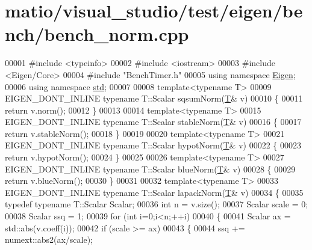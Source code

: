 \hypertarget{matio_2visual__studio_2test_2eigen_2bench_2bench__norm_8cpp_source}{}\section{matio/visual\+\_\+studio/test/eigen/bench/bench\+\_\+norm.cpp}
\label{matio_2visual__studio_2test_2eigen_2bench_2bench__norm_8cpp_source}

\begin{DoxyCode}
00001 \textcolor{preprocessor}{#include <typeinfo>}
00002 \textcolor{preprocessor}{#include <iostream>}
00003 \textcolor{preprocessor}{#include <Eigen/Core>}
00004 \textcolor{preprocessor}{#include "BenchTimer.h"}
00005 \textcolor{keyword}{using namespace }\hyperlink{namespace_eigen}{Eigen};
00006 \textcolor{keyword}{using namespace }\hyperlink{namespacestd}{std};
00007 
00008 \textcolor{keyword}{template}<\textcolor{keyword}{typename} T>
00009 EIGEN\_DONT\_INLINE \textcolor{keyword}{typename} T::Scalar sqsumNorm(\hyperlink{group___sparse_core___module}{T}& v)
00010 \{
00011   \textcolor{keywordflow}{return} v.norm();
00012 \}
00013 
00014 \textcolor{keyword}{template}<\textcolor{keyword}{typename} T>
00015 EIGEN\_DONT\_INLINE \textcolor{keyword}{typename} T::Scalar stableNorm(\hyperlink{group___sparse_core___module}{T}& v)
00016 \{
00017   \textcolor{keywordflow}{return} v.stableNorm();
00018 \}
00019 
00020 \textcolor{keyword}{template}<\textcolor{keyword}{typename} T>
00021 EIGEN\_DONT\_INLINE \textcolor{keyword}{typename} T::Scalar hypotNorm(\hyperlink{group___sparse_core___module}{T}& v)
00022 \{
00023   \textcolor{keywordflow}{return} v.hypotNorm();
00024 \}
00025 
00026 \textcolor{keyword}{template}<\textcolor{keyword}{typename} T>
00027 EIGEN\_DONT\_INLINE \textcolor{keyword}{typename} T::Scalar blueNorm(\hyperlink{group___sparse_core___module}{T}& v)
00028 \{
00029   \textcolor{keywordflow}{return} v.blueNorm();
00030 \}
00031 
00032 \textcolor{keyword}{template}<\textcolor{keyword}{typename} T>
00033 EIGEN\_DONT\_INLINE \textcolor{keyword}{typename} T::Scalar lapackNorm(\hyperlink{group___sparse_core___module}{T}& v)
00034 \{
00035   \textcolor{keyword}{typedef} \textcolor{keyword}{typename} T::Scalar Scalar;
00036   \textcolor{keywordtype}{int} n = v.size();
00037   Scalar scale = 0;
00038   Scalar ssq = 1;
00039   \textcolor{keywordflow}{for} (\textcolor{keywordtype}{int} i=0;i<n;++i)
00040   \{
00041     Scalar ax = std::abs(v.coeff(i));
00042     \textcolor{keywordflow}{if} (scale >= ax)
00043     \{
00044       ssq += numext::abs2(ax/scale);

\end{DoxyCode}
